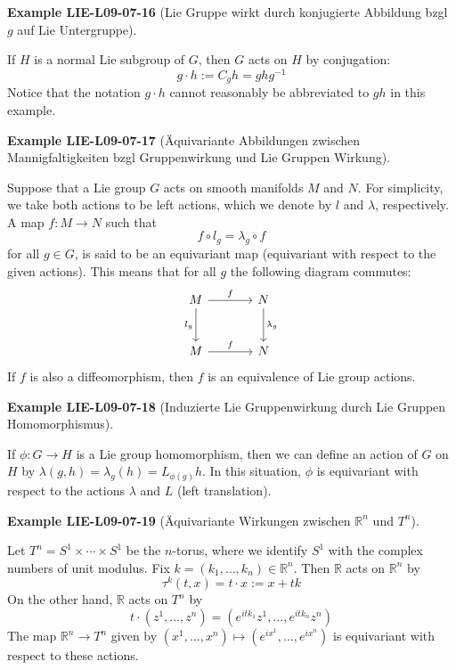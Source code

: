 \documentclass[10pt, letterpaper]{article}
\newcommand{\R}{\mathbb{R}}
\newcommand{\CustomHeading}[3]{%
  \par\medskip\noindent%
  \textbf{#1 #2} \textnormal{(#3)}.\enskip%
}
\newenvironment{EXA}[2]{\CustomHeading{Example}{#1}{#2}}{}
\begin{document}
\begin{EXA}{LIE-L09-07-16}{Lie Gruppe wirkt durch konjugierte Abbildung bzgl $g$ auf Lie Untergruppe}
If $H$ is a normal Lie subgroup of $G$, then $G$ acts on $H$ by conjugation:
$$
g \cdot h:=C_{g} h=g h g^{-1}
$$
Notice that the notation $g \cdot h$ cannot reasonably be abbreviated to $g h$ in this example.
\end{EXA}

\begin{EXA}{LIE-L09-07-17}{Äquivariante Abbildungen zwischen Mannigfaltigkeiten bzgl Gruppenwirkung und Lie Gruppen Wirkung}
Suppose that a Lie group $G$ acts on smooth manifolds $M$ and $N$. For simplicity, we take both actions to be left actions, which we denote by $l$ and $\lambda$, respectively. A map $f: M \rightarrow N$ such that 
$$f \circ l_{g}=\lambda_{g} \circ f$$ 
for all $g \in G$, is said to be an equivariant map (equivariant with respect to the given actions). This means that for all $g$ the following diagram commutes:
\[
\begin{tikzcd}[row sep=large, column sep=large]
M \arrow[r, "f"] \arrow[d, "l_g"'] & N \arrow[d, "\lambda_g"] \\
M \arrow[r, "f"] & N
\end{tikzcd}
\]
If $f$ is also a diffeomorphism, then $f$ is an equivalence of Lie group actions.
\end{EXA}

\begin{EXA}{LIE-L09-07-18}{Induzierte Lie Gruppenwirkung durch Lie Gruppen Homomorphismus}
If $\phi: G \rightarrow H$ is a Lie group homomorphism, then we can define an action of $G$ on $H$ by $\lambda(g, h)=\lambda_{g}(h)=L_{\phi(g)} h$. In this situation, $\phi$ is equivariant with respect to the actions $\lambda$ and $L$ (left translation).
\end{EXA}

\begin{EXA}{LIE-L09-07-19}{Äquivariante Wirkungen zwischen $\R^n$ und $T^n$}
Let $T^{n}=S^{1} \times \cdots \times S^{1}$ be the $n$-torus, where we identify $S^{1}$ with the complex numbers of unit modulus. Fix $k=\left(k_{1}, \ldots, k_{n}\right) \in \mathbb{R}^{n}$. Then $\mathbb{R}$ acts on $\mathbb{R}^{n}$ by 
$$\tau^{k}(t, x)=t \cdot x:=x+t k$$ 
On the other hand, $\mathbb{R}$ acts on $T^{n}$ by 
$$t \cdot\left(z^{1}, \ldots, z^{n}\right)=\left(e^{i t k_{1}} z^{1}, \ldots, e^{i t k_{n}} z^{n}\right)$$ 
The map $\mathbb{R}^{n} \rightarrow T^{n}$ given by $\left(x^{1}, \ldots, x^{n}\right) \mapsto\left(e^{i x^{1}}, \ldots, e^{i x^{n}}\right)$ is equivariant with respect to these actions.
\end{EXA}
\end{document}

